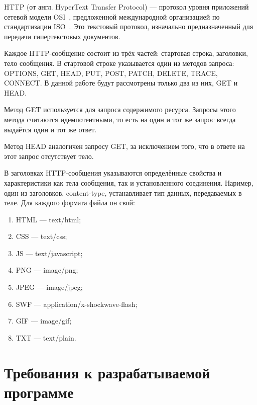 HTTP (от англ. HyperText Transfer Protocol) --- протокол уровня приложений сетевой модели OSI~\cite{OSI}, предложенной международной организацией по стандартизации ISO~\cite{ISO}.
Это текстовый протокол, изначально предназначенный для передачи гипертекстовых документов.

Каждое HTTP-сообщение состоит из трёх частей: стартовая строка, заголовки, тело сообщения.
В стартовой строке указывается один из методов запроса: OPTIONS, GET, HEAD, PUT, POST, PATCH, DELETE, TRACE, CONNECT.
В данной работе будут рассмотрены только два из них, GET и HEAD.

Метод GET используется для запроса содержимого ресурса. Запросы этого метода считаются идемпотентными, то есть на один и тот же запрос всегда выдаётся один и тот же ответ.

Метод HEAD аналогичен запросу GET, за исключением того, что в ответе на этот запрос отсутствует тело.

В заголовках HTTP-сообщения указываются определённые свойства и характеристики как тела сообщения, так и установленного соединения.
Наример, один из заголовков, content-type, устанавливает тип данных, передаваемых в теле.
Для каждого формата файла он свой:
\begin{enumerate}
	\item HTML --- text/html;
	\item CSS --- text/css;
	\item JS --- text/javascript;
	\item PNG --- image/png;
	\item JPEG --- image/jpeg;
	\item SWF --- application/x-shockwave-flash;
	\item GIF --- image/gif;
	\item TXT --- text/plain.
\end{enumerate}

\section{Требования к разрабатываемой программе}

